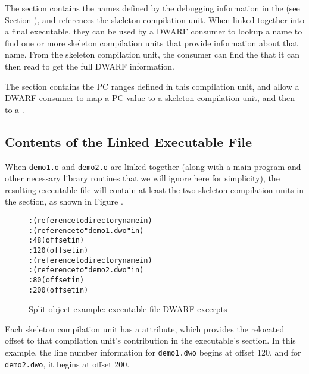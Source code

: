 The \dotdebugnames{}
section contains the names defined by the debugging
information in the \splitDWARFobjectfile{} 
(see Section ), 
and references the skeleton compilation unit. 
When linked together into a final executable,
they can be used by a DWARF consumer to lookup a name to find one
or more skeleton compilation units that provide information about
that name. From the skeleton compilation unit, the consumer can
find the \splitDWARFobjectfile{} that it can then read to get the full
DWARF information.

The \dotdebugaranges{} section contains the PC ranges defined in this
compilation unit, and allow a DWARF consumer to map a PC value to
a skeleton compilation unit, and then to a \splitDWARFobjectfile.


\bb
\subsection{Contents of the Linked Executable File}
When \texttt{demo1.o} and \texttt{demo2.o} are linked together (along with 
a main program and other necessary library routines that we will ignore here
for simplicity), the resulting executable file will contain at least
the two skeleton compilation units in the \dotdebuginfo{} section, as shown in 
Figure .
\eb

\begin{figure}[ht]
\bb
\begin{dwflisting}
\begin{alltt}

    \DWTAGskeletonunit
        \DWATcompdir: (reference to directory name in \dotdebugstr)
        \DWATdwoname: (reference to "demo1.dwo" in \dotdebugstr)
        \DWATaddrbase: 48 (offset in \dotdebugaddr)
        \DWATstmtlist: 120 (offset in \dotdebugline)
    \DWTAGskeletonunit
        \DWATcompdir: (reference to directory name in \dotdebugstr)
        \DWATdwoname: (reference to "demo2.dwo" in \dotdebugstr)
        \DWATaddrbase: 80 (offset in \dotdebugaddr)
        \DWATstmtlist: 200 (offset in \dotdebugline)

\end{alltt}
\end{dwflisting}
\caption{Split object example: executable file DWARF excerpts}
\label{fig:splitobjectexampleexecutablefiledwarfexcerpts}
\eb
\end{figure}

\bb
Each skeleton compilation unit has a \DWATstmtlist{} attribute,
which provides the relocated offset to that compilation unit's
contribution in the executable's \dotdebugline{} section. In this
example, the line number information for \texttt{demo1.dwo} begins at
offset 120, and for \texttt{demo2.dwo}, it begins at offset 200.

